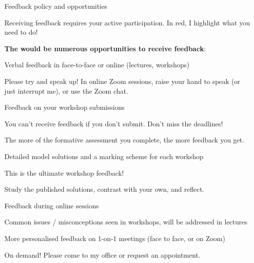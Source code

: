 \begin{frame}{Feedback policy and opportunities}

{\color{red} \scriptsize 
Receiving feedback requires your active participation. In red, I highlight what you need to do!}\\

\vspace{0.1cm}

{\bf The would be numerous opportunities to receive feedback}:

\begin{itemize}
{\small
  \item Verbal feedback in face-to-face or online (lectures, workshops)
  \begin{itemize}
  {\scriptsize
    \item {\color{red}Please try and speak up! In online Zoom sessions, raise your hand to speak (or just interrupt me), or use the Zoom chat.}
  }
  \end{itemize}

  \item Feedback on your workshop submissions
  \begin{itemize}
  {\scriptsize
    \item {\color{red}You can't receive feedback if you don't submit. Don't miss the deadlines!}
    \item {\color{red}The more of the formative assessment you complete, the more feedback you get.}\\
  }
  \end{itemize}
 
  \item Detailed model solutions and a marking scheme for each workshop
  \begin{itemize}
  {\scriptsize
    \item This is the ultimate workshop feedback!
    \item {\color{red}Study the published solutions, contrast with your own, and reflect.}
  }
  \end{itemize}
 
  \item Feedback during online sessions
  \begin{itemize}
  {\scriptsize 
    \item Common issues / misconceptions seen in workshops,
      will be addressed in lectures
  }
  \end{itemize}

  \item More personalised feedback on 1-on-1 meetings (face to face, or on Zoom)
  \begin{itemize}
  {\scriptsize
    \item {\color{red}On demand! Please come to my office or request an appointment.}
  }
  \end{itemize}
    
}
\end{itemize}
\end{frame}
